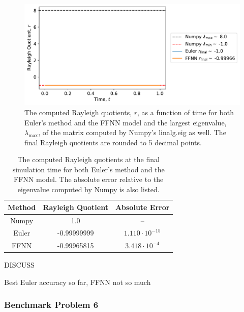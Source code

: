\begin{figure}[H]
\begin{center}\includegraphics[scale=0.6]{latex/figures/eigval_benchrun4.pdf}
\end{center}
\caption{The computed Rayleigh quotients, $r$, as a function of time for both Euler's method and the FFNN model and the largest eigenvalue, $\lambda_\mathrm{max}$, of the matrix computed by Numpy's linalg.eig as well. The final Rayleigh quotients are rounded to 5 decimal points.}
\label{fig:benchrun4}
\end{figure}

\begin{table}[H]
\caption{The computed Rayleigh quotients at the final simulation time for both Euler's method and the FFNN model. The absolute error relative to the eigenvalue computed by Numpy is also listed.}
\centering
{}
\begin{tabular}{c|c|c}
\hline
\hline 
Method & Rayleigh Quotient & Absolute Error
\\
\hline 
\hline 
Numpy & 1.0 & –
\\
Euler & -0.99999999 & $1.110 \cdot 10^{-15}$  
\\
FFNN & -0.99965815 & $3.418 \cdot 10^{-4}$
\\
\hline
\hline 
\end{tabular}
\label{tab:eigbench4}
\end{table}

DISCUSS

Best Euler accuracy so far, FFNN not so much


\subsubsection{Benchmark Problem 6}


